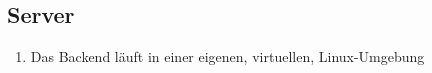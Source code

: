 \subsection{Server}

\begin{enumerate}
    \item Das Backend läuft in einer eigenen, virtuellen, Linux-Umgebung
\end{enumerate}